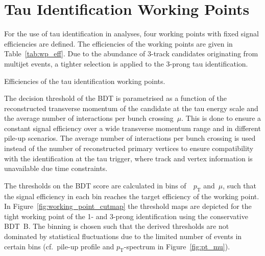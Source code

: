 \section{Tau Identification Working Points}
\label{sec:bdt_working_points}

For the use of tau identification in analyses, four working points with fixed
signal efficiencies are defined. The efficiencies of the working points are
given in Table~\ref{tab:wp_eff}. Due to the abundance of 3-track \tauhadvis
candidates originating from multijet events, a tighter selection is applied to
the 3-prong tau identification.

\begin{table}[htb]
  \centering
  {\small}
  \caption{Efficiencies of the tau identification working points.}
  \label{tab:wp_eff}
\end{table}

The decision threshold of the BDT is parametrised as a function of the
reconstructed transverse momentum of the \tauhadvis candidate at the tau energy
scale and the average number of interactions per bunch crossing~$\mu$. This is
done to ensure a constant signal efficiency over a wide transverse momentum
range and in different pile-up scenarios. The average number of interactions per
bunch crossing is used instead of the number of reconstructed primary vertices
to ensure compatibility with the identification at the tau trigger, where track
and vertex information is unavailable due time constraints.

The thresholds on the BDT score are calculated in bins
of~\tauhadvis~$p_\text{T}$ and~$\mu$, such that the signal efficiency in each
bin reaches the target efficiency of the working point. In
Figure~\ref{fig:working_point_cutmap} the threshold maps are depicted for the
tight working point of the 1- and 3-prong identification using the conservative
\mbox{BDT B}. The binning is chosen such that the derived thresholds are not
dominated by statistical fluctuations due to the limited number of events in
certain bins (cf.\ pile-up profile and \tauhadvis $p_\text{T}$-spectrum in
Figure~\ref{fig:pt_mu}).

